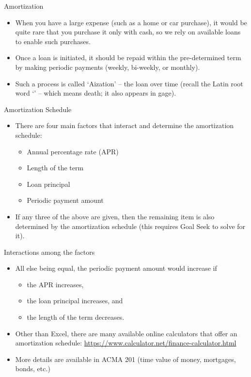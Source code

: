 \documentclass{beamer}
\begin{document}
\begin{frame}{Amortization}
\begin{itemize}
  \item When you have a large expense (such as a home or car purchase), it would be quite
        rare that you purchase it only with cash, so we rely on available loans to
        enable such purchases.
  \vspace{0.5em}
  \item Once a loan is initiated, it should be repaid within the pre-determined term by
        making periodic payments (weekly, bi-weekly, or monthly).
  \vspace{0.5em}
  \item Such a process is called `Aization' --  the loan over
        time (recall the Latin root word `' -- which means death; it also
        appears in gage).
\end{itemize}
\end{frame}

\begin{frame}{Amortization Schedule}
\begin{itemize}
  \item There are four main factors that interact and determine the amortization
        schedule:
  \begin{itemize}
    \item Annual percentage rate (APR)
    \item Length of the term
    \item Loan principal
    \item Periodic payment amount
  \end{itemize}
  \vspace{0.5em}
  \item If any three of the above are given, then the remaining item is also determined
        by the amortization schedule (this requires Goal Seek to solve for it).
\end{itemize}
\end{frame}

\begin{frame}{Interactions among the factors}
\begin{itemize}
  \item All else being equal, the periodic payment amount would increase if
  \begin{itemize}
    \item the APR increases,
    \item the loan principal increases, and
    \item the length of the term decreases.
  \end{itemize}
  \vspace{0.5em}
  \item Other than Excel, there are many available online calculators that offer an
        amortization schedule:
        \url{https://www.calculator.net/finance-calculator.html}
  \vspace{0.5em}
  \item More details are available in ACMA 201 (time value of money, mortgages, bonds,
        etc.)
\end{itemize}
\end{frame}
\end{document}
